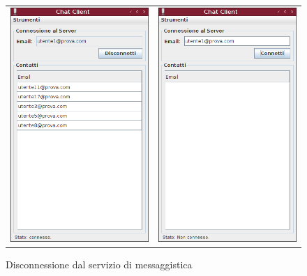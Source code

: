 \documentclass[a4paper, 11pt]{article} %
\begin{document}
\begin{figure}[H]
\hspace{-2.0cm}
\begin{tabular}{cc}
  \includegraphics[width=80mm]{images/client-13.png} & \includegraphics[width=80mm]{images/client-14.png}
\end{tabular}
\caption{Disconnessione dal servizio di messaggistica}
\end{figure}
\end{document}
